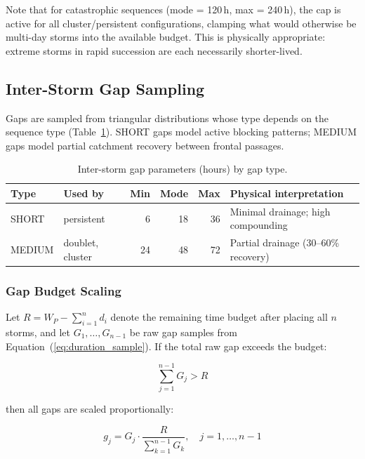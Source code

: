 \documentclass[11pt,a4paper]{article}
\begin{document}
\noindent Note that for catastrophic sequences (mode = 120\,h, max = 240\,h), the cap
is active for all cluster/persistent configurations, clamping what would otherwise be
multi-day storms into the available budget. This is physically appropriate: extreme
storms in rapid succession are each necessarily shorter-lived.

\subsection{Inter-Storm Gap Sampling}
\label{sec:gap}

Gaps are sampled from triangular distributions whose type depends on the sequence type
(Table~\ref{tab:gap_params}). SHORT gaps model active blocking patterns; MEDIUM gaps
model partial catchment recovery between frontal passages.

\begin{table}[H]
  \centering
  \caption{Inter-storm gap parameters (hours) by gap type.}
  \label{tab:gap_params}
  \begin{tabular}{llrrrl}
    \toprule
    \textbf{Type} & \textbf{Used by} & \textbf{Min} & \textbf{Mode} & \textbf{Max}
      & \textbf{Physical interpretation} \\
    \midrule
    SHORT  & persistent & 6 & 18 & 36 & Minimal drainage; high compounding \\
    MEDIUM & doublet, cluster & 24 & 48 & 72 & Partial drainage (30--60\% recovery) \\
    \bottomrule
  \end{tabular}
\end{table}

\subsubsection{Gap Budget Scaling}
\label{sec:gap_scale}

Let $R = W_P - \sum_{i=1}^{n} d_i$ denote the remaining time budget after placing all
$n$ storms, and let $G_1, \ldots, G_{n-1}$ be raw gap samples from
Equation~(\ref{eq:duration_sample}). If the total raw gap exceeds the budget:

\begin{equation}
  \sum_{j=1}^{n-1} G_j > R
  \label{eq:gap_overflow}
\end{equation}

\noindent then all gaps are scaled proportionally:

\begin{equation}
  g_j = G_j \cdot \frac{R}{\sum_{k=1}^{n-1} G_k}, \quad j = 1, \ldots, n-1
  \label{eq:gap_scale}
\end{equation}
\end{document}
